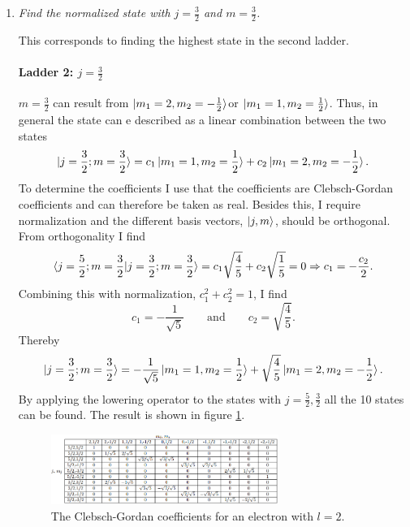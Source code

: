 \begin{example}
\begin{enumerate}
		\item \emph{Find the normalized state with $j=\frac{3}{2}$ and $m=\frac{3}{2}$.}\newline
		
		This corresponds to finding the highest state in the second ladder.
		
		\paragraph{Ladder 2: $j=\frac{3}{2}$\normalsize}
		$m=\frac{3}{2}$ can result from $\ket{m_1=2,m_2=-\frac{1}{2}}$\normalsize \newline or $\ket{m_1=1,m_2=\frac{1}{2}}$\normalsize. Thus, in general the state can e described as a linear combination between the two states
		\begin{equation}
			\ket{j=\frac{3}{2};m=\frac{3}{2}}=c_1\ket{m_1=1,m_2=\frac{1}{2}}+c_2\ket{m_1=2,m_2=-\frac{1}{2}}.
		\end{equation} 
		To determine the coefficients I use that the coefficients are Clebsch-Gordan coefficients and can therefore be taken as real. Besides this, I require normalization and the different basis vectors, $\ket{j,m}$, should be orthogonal. From orthogonality I find
		\begin{equation}
			\braket{j=\frac{5}{2};m=\frac{3}{2}|j=\frac{3}{2};m=\frac{3}{2}}=c_1\sqrt{\frac{4}{5}}+c_2\sqrt{\frac{1}{5}}=0 \Rightarrow c_1=-\frac{c_2}{2}.
		\end{equation} 
		Combining this with normalization, $c_1^2+c_2^2=1$, I find
		\begin{equation}
			c_1=-\frac{1}{\sqrt{5}} \qquad \mbox{and} \qquad c_2=\sqrt{\frac{4}{5}}.
		\end{equation} 
		Thereby
		\begin{equation}
			\ket{j=\frac{3}{2};m=\frac{3}{2}}=-\frac{1}{\sqrt{5}}\ket{m_1=1,m_2=\frac{1}{2}}+\sqrt{\frac{4}{5}}\ket{m_1=2,m_2=-\frac{1}{2}}.
		\end{equation} 
		By applying the lowering operator to the states with $j=\frac{5}{2},\frac{3}{2}$ all the 10 states can be found. The result is shown in figure \ref{fig:CG}.
		\begin{figure}[ht]
			\captionsetup{width=1\textwidth}
			\centering
			\includegraphics[width=0.7\textwidth]{figures/CG1}
			\caption{The Clebsch-Gordan coefficients for an electron with $l=2$.}
			\label{fig:CG}
		\end{figure}
		

\end{enumerate}
\end{example}
